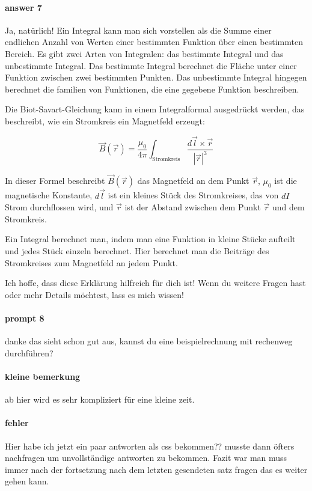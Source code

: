 \documentclass{article}
\begin{document}
\paragraph{answer 7} %
\label{par:answer 7}
Ja, natürlich! Ein Integral kann man sich vorstellen als die Summe einer
endlichen Anzahl von Werten einer bestimmten Funktion über einen bestimmten
Bereich. Es gibt zwei Arten von Integralen: das bestimmte Integral und das
unbestimmte Integral. Das bestimmte Integral berechnet die Fläche unter einer
Funktion zwischen zwei bestimmten Punkten. Das unbestimmte Integral hingegen
berechnet die familien von Funktionen, die eine gegebene Funktion beschreiben.

Die Biot-Savart-Gleichung kann in einem Integralformal ausgedrückt werden, das
beschreibt, wie ein Stromkreis ein Magnetfeld erzeugt:

$$ \vec{B}(\vec{r}) = \frac{\mu_0}{4\pi} \int_\text{Stromkreis} \frac{d\vec{l}
\times \vec{r}}{|\vec{r}|^3} $$

In dieser Formel beschreibt $\vec{B}(\vec{r})$ das Magnetfeld an dem Punkt $\vec{r}$, $\mu_0$ ist die magnetische Konstante, $d\vec{l}$ ist ein kleines Stück des Stromkreises, das von $dI$ Strom durchflossen wird, und $\vec{r}$ ist der Abstand zwischen dem Punkt $\vec{r}$ und dem Stromkreis.

Ein Integral berechnet man, indem man eine Funktion in kleine Stücke aufteilt und jedes Stück einzeln berechnet. Hier berechnet man die Beiträge des Stromkreises zum Magnetfeld an jedem Punkt.

Ich hoffe, dass diese Erklärung hilfreich für dich ist! Wenn du weitere Fragen hast oder mehr Details möchtest, lass es mich wissen!

\paragraph{prompt 8} %
\label{par:prompt 8}
danke das sieht schon gut aus, kannst du eine beispielrechnung mit rechenweg durchführen?

\paragraph{kleine bemerkung} %
\label{par:kleine bemerkung}
ab hier wird es sehr kompliziert für eine kleine zeit.

\paragraph{fehler} %
\label{par:fehler}
Hier habe ich jetzt ein paar antworten als css bekommen?? musste dann öfters
nachfragen um unvollständige antworten zu bekommen. Fazit war man muss immer
nach der fortsetzung nach dem letzten gesendeten satz fragen das es weiter
gehen kann.
\end{document}
